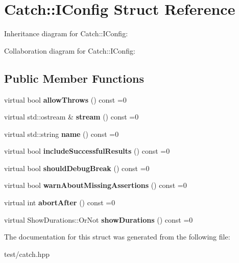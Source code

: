 \hypertarget{structCatch_1_1IConfig}{}\section{Catch\+:\+:I\+Config Struct Reference}
\label{structCatch_1_1IConfig}


Inheritance diagram for Catch\+:\+:I\+Config\+:


Collaboration diagram for Catch\+:\+:I\+Config\+:
\subsection*{Public Member Functions}
\begin{DoxyCompactItemize}
\item 
virtual bool {\bfseries allow\+Throws} () const =0\hypertarget{structCatch_1_1IConfig_aadb95f849359de1e6eb915aab063e542}{}\label{structCatch_1_1IConfig_aadb95f849359de1e6eb915aab063e542}

\item 
virtual std\+::ostream \& {\bfseries stream} () const =0\hypertarget{structCatch_1_1IConfig_aa4c3fe0825e7e6ebdcfa6abc7abf3617}{}\label{structCatch_1_1IConfig_aa4c3fe0825e7e6ebdcfa6abc7abf3617}

\item 
virtual std\+::string {\bfseries name} () const =0\hypertarget{structCatch_1_1IConfig_aa2315800a05c19db71518b1edc39d43b}{}\label{structCatch_1_1IConfig_aa2315800a05c19db71518b1edc39d43b}

\item 
virtual bool {\bfseries include\+Successful\+Results} () const =0\hypertarget{structCatch_1_1IConfig_a2f1b0391019b9ce69921527a684eab23}{}\label{structCatch_1_1IConfig_a2f1b0391019b9ce69921527a684eab23}

\item 
virtual bool {\bfseries should\+Debug\+Break} () const =0\hypertarget{structCatch_1_1IConfig_a5b886c5aad9001e90f63a7cf0726af63}{}\label{structCatch_1_1IConfig_a5b886c5aad9001e90f63a7cf0726af63}

\item 
virtual bool {\bfseries warn\+About\+Missing\+Assertions} () const =0\hypertarget{structCatch_1_1IConfig_a75d970c495a28e46b8e9b04a1d32149f}{}\label{structCatch_1_1IConfig_a75d970c495a28e46b8e9b04a1d32149f}

\item 
virtual int {\bfseries abort\+After} () const =0\hypertarget{structCatch_1_1IConfig_a363f3388a439d02217f37198eff96744}{}\label{structCatch_1_1IConfig_a363f3388a439d02217f37198eff96744}

\item 
virtual Show\+Durations\+::\+Or\+Not {\bfseries show\+Durations} () const =0\hypertarget{structCatch_1_1IConfig_abaa97d281484278291f0d3db6d404aeb}{}\label{structCatch_1_1IConfig_abaa97d281484278291f0d3db6d404aeb}

\end{DoxyCompactItemize}


The documentation for this struct was generated from the following file\+:\begin{DoxyCompactItemize}
\item 
test/catch.\+hpp\end{DoxyCompactItemize}
